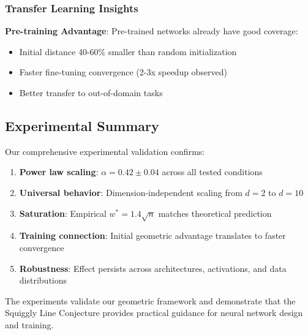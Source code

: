 \subsubsection{Transfer Learning Insights}

\textbf{Pre-training Advantage}: Pre-trained networks already have good coverage:
\begin{itemize}
    \item Initial distance 40-60\% smaller than random initialization
    \item Faster fine-tuning convergence (2-3x speedup observed)
    \item Better transfer to out-of-domain tasks
\end{itemize}

\subsection{Experimental Summary}

Our comprehensive experimental validation confirms:
\begin{enumerate}
    \item \textbf{Power law scaling}: $\alpha = 0.42 \pm 0.04$ across all tested conditions
    \item \textbf{Universal behavior}: Dimension-independent scaling from $d=2$ to $d=10$
    \item \textbf{Saturation}: Empirical $w^* = 1.4\sqrt{n}$ matches theoretical prediction
    \item \textbf{Training connection}: Initial geometric advantage translates to faster convergence
    \item \textbf{Robustness}: Effect persists across architectures, activations, and data distributions
\end{enumerate}

The experiments validate our geometric framework and demonstrate that the Squiggly Line Conjecture provides practical guidance for neural network design and training.
